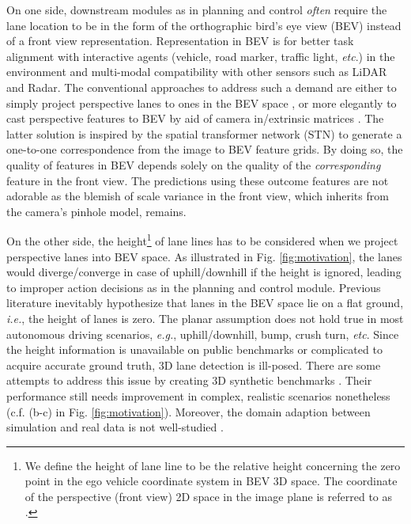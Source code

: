\documentclass[runningheads]{llncs}
\begin{document}
On one side, 
downstream modules as in planning and control \textit{often} require the lane location to be in the form of the orthographic bird's eye view (BEV) instead of a front view representation.
Representation in BEV is for better task alignment with interactive agents (vehicle, road marker, traffic light, \textit{etc}.)  in the environment and multi-modal compatibility with other sensors such as LiDAR and Radar.
The conventional approaches to address such a demand are
either to simply project perspective lanes to ones in the BEV space \cite{wang2014approach,meyer2018deep}, or more elegantly to 
 cast perspective features to BEV by aid of camera in/extrinsic matrices \cite{Garnett_2019_ICCV,guo2020gen,yu2020detecting}. 
The latter solution is inspired by the spatial transformer network (STN) \cite{jaderberg2015spatial} to generate a one-to-one correspondence from the image to BEV feature grids.
By doing so, 
the quality of features in BEV
depends solely on the quality of the \textit{corresponding} feature in the front view.
The predictions using these outcome features are not adorable as
the blemish of scale variance in the front view, which inherits from the camera's pinhole model, remains.


On the other side, the height\footnote{We define the height of lane line  to be the relative height concerning the zero point in the ego vehicle coordinate system  in BEV 3D space. The coordinate of the perspective (front view) 2D space in the image plane is referred to as .} of lane lines has to be considered when we project perspective lanes into BEV space. As illustrated in Fig. \ref{fig:motivation}, the lanes would diverge/converge in case of uphill/downhill if the height is ignored, leading to improper action decisions as in the planning and control module.
Previous literature \cite{wang2014approach,neven2018towards,su2021structure} inevitably 
hypothesize that lanes in the BEV space lie on a flat ground, \textit{i.e.},  the height of lanes is zero.
The planar assumption does not hold true in most autonomous driving scenarios, \textit{e.g.}, uphill/downhill, bump, crush turn, \textit{etc}. 
{Since the height information is unavailable on public benchmarks or complicated to acquire accurate ground truth,}
3D lane detection is ill-posed.
There are some attempts to address this issue by creating 3D synthetic benchmarks \cite{Garnett_2019_ICCV,guo2020gen}.
Their performance still needs improvement in complex, realistic scenarios {nonetheless (c.f. (b-c) in Fig. \ref{fig:motivation})}. 
Moreover, 
the domain adaption between simulation and real data is not well-studied \cite{garnett2020synthetic}.
\end{document}
